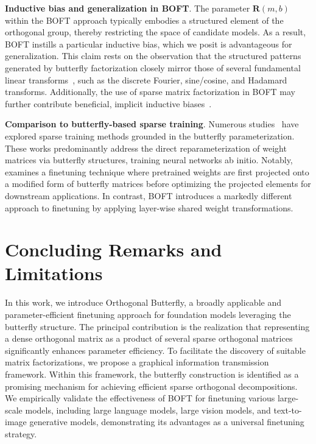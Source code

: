 \textbf{Inductive bias and generalization in BOFT}. The parameter $\bm{R}(m,b)$ within the BOFT approach typically embodies a structured element of the orthogonal group, thereby restricting the space of candidate models. As a result, BOFT instills a particular inductive bias, which we posit is advantageous for generalization. This claim rests on the observation that the structured patterns generated by butterfly factorization closely mirror those of several fundamental linear transforms~\cite{dao2019kaleidoscope}, such as the discrete Fourier, sine/cosine, and Hadamard transforms. Additionally, the use of sparse matrix factorization in BOFT may further contribute beneficial, implicit inductive biases~\cite{gunasekar2017implicit,li2018algorithmic,liu2019neural}.

\textbf{Comparison to butterfly-based sparse training}. Numerous studies~\cite{dao2019learning,dao2019kaleidoscope,chen2022pixelated,dao2022monarch} have explored sparse training methods grounded in the butterfly parameterization. These works predominantly address the direct reparameterization of weight matrices via butterfly structures, training neural networks ab initio. Notably, \cite{dao2022monarch} examines a finetuning technique where pretrained weights are first projected onto a modified form of butterfly matrices before optimizing the projected elements for downstream applications. In contrast, BOFT introduces a markedly different approach to finetuning by applying layer-wise shared weight transformations.



\section{Concluding Remarks and Limitations}

In this work, we introduce Orthogonal Butterfly, a broadly applicable and parameter-efficient finetuning approach for foundation models leveraging the butterfly structure. The principal contribution is the realization that representing a dense orthogonal matrix as a product of several sparse orthogonal matrices significantly enhances parameter efficiency. To facilitate the discovery of suitable matrix factorizations, we propose a graphical information transmission framework. Within this framework, the butterfly construction is identified as a promising mechanism for achieving efficient sparse orthogonal decompositions. We empirically validate the effectiveness of BOFT for finetuning various large-scale models, including large language models, large vision models, and text-to-image generative models, demonstrating its advantages as a universal finetuning strategy.

